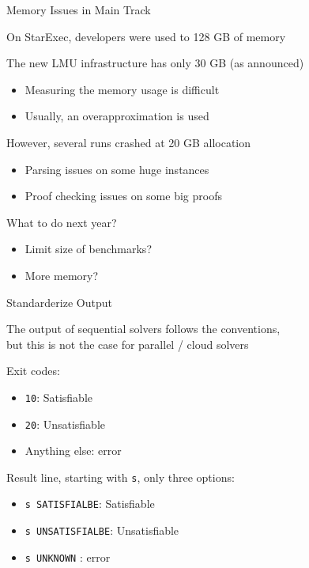 \documentclass{beamer}
\begin{document}
\begin{frame}{Memory Issues in Main Track}

\large

On StarExec, developers were used to 128 GB of memory

\bigskip

The new LMU infrastructure has only 30 GB (as announced)
\begin{itemize}
\item Measuring the memory usage is difficult 
\item Usually, an overapproximation is used
\end{itemize}

\bigskip

However, several runs crashed at 20 GB allocation
\begin{itemize}
\item Parsing issues on some huge instances
\item Proof checking issues on some big proofs
\end{itemize}

\pause
\bigskip

What to do next year?
\begin{itemize}
\item Limit size of benchmarks?
\item More memory?
\end{itemize}

\end{frame}

\begin{frame}{Standarderize Output}

\large

The output of sequential solvers follows the conventions,\\
but this is not the case for parallel / cloud solvers

\bigskip

Exit codes:
\begin{itemize}
\item {\tt 10}: Satisfiable
\item {\tt 20}: Unsatisfiable
\item Anything else: error
\end{itemize}

\bigskip

Result line, starting with {\tt s}, only three options:
\begin{itemize}
\item {\tt s SATISFIALBE}: Satisfiable
\item {\tt s UNSATISFIALBE}: Unsatisfiable
\item {\tt s UNKNOWN} : error
\end{itemize}

\end{frame}
\end{document}
